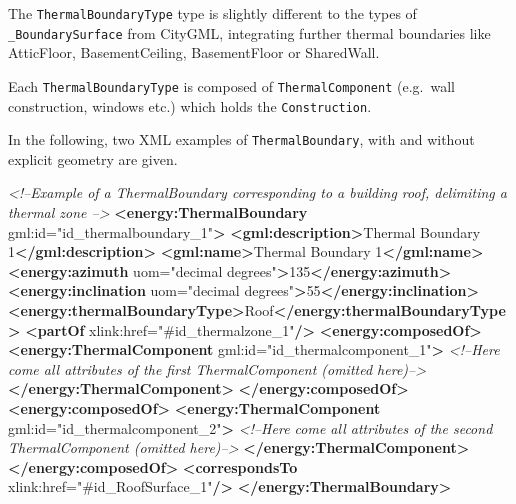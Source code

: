 \documentclass[a4paper,12pt]{article}
\newenvironment{Shaded}{}{}
\newcommand{\KeywordTok}[1]{\textcolor[rgb]{0.00,0.44,0.13}{\textbf{{#1}}}}
\newcommand{\StringTok}[1]{\textcolor[rgb]{0.25,0.44,0.63}{{#1}}}
\newcommand{\CommentTok}[1]{\textcolor[rgb]{0.38,0.63,0.69}{\textit{{#1}}}}
\newcommand{\OtherTok}[1]{\textcolor[rgb]{0.00,0.44,0.13}{{#1}}}
\newcommand{\NormalTok}[1]{{#1}}
\begin{document}
The \texttt{ThermalBoundaryType} type is slightly different to the types
of \texttt{\_BoundarySurface} from CityGML, integrating further thermal
boundaries like AtticFloor, BasementCeiling, BasementFloor or
SharedWall.

Each \texttt{ThermalBoundaryType} is composed of
\texttt{ThermalComponent} (e.g.~wall construction, windows etc.) which
holds the \texttt{Construction}.

In the following, two XML examples of \texttt{ThermalBoundary}, with and
without explicit geometry are given.

\begin{Shaded}
\begin{Highlighting}[]
\CommentTok{<!--Example of a ThermalBoundary corresponding to a building roof, delimiting a thermal zone -->}
\KeywordTok{<energy:ThermalBoundary}\OtherTok{ gml:id=}\StringTok{"id_thermalboundary_1"}\KeywordTok{>}
    \KeywordTok{<gml:description>}\NormalTok{Thermal Boundary 1}\KeywordTok{</gml:description>}
    \KeywordTok{<gml:name>}\NormalTok{Thermal Boundary 1}\KeywordTok{</gml:name>}
    \KeywordTok{<energy:azimuth}\OtherTok{ uom=}\StringTok{"decimal degrees"}\KeywordTok{>}\NormalTok{135}\KeywordTok{</energy:azimuth>}
    \KeywordTok{<energy:inclination}\OtherTok{ uom=}\StringTok{"decimal degrees"}\KeywordTok{>}\NormalTok{55}\KeywordTok{</energy:inclination>}
    \KeywordTok{<energy:thermalBoundaryType>}\NormalTok{Roof}\KeywordTok{</energy:thermalBoundaryType>}
    \KeywordTok{<partOf}\OtherTok{ xlink:href=}\StringTok{"#id_thermalzone_1"}\KeywordTok{/>}
    \KeywordTok{<energy:composedOf>}
        \KeywordTok{<energy:ThermalComponent}\OtherTok{ gml:id=}\StringTok{"id_thermalcomponent_1"}\KeywordTok{>}
            \CommentTok{<!--Here come all attributes of the first ThermalComponent (omitted here)-->}
        \KeywordTok{</energy:ThermalComponent>}
    \KeywordTok{</energy:composedOf>}
    \KeywordTok{<energy:composedOf>}
        \KeywordTok{<energy:ThermalComponent}\OtherTok{ gml:id=}\StringTok{"id_thermalcomponent_2"}\KeywordTok{>}
            \CommentTok{<!--Here come all attributes of the second ThermalComponent (omitted here)-->}
        \KeywordTok{</energy:ThermalComponent>}
    \KeywordTok{</energy:composedOf>}
    \KeywordTok{<correspondsTo}\OtherTok{ xlink:href=}\StringTok{"#id_RoofSurface_1"}\KeywordTok{/>}
\KeywordTok{</energy:ThermalBoundary>}
\end{Highlighting}
\end{Shaded}
\end{document}
